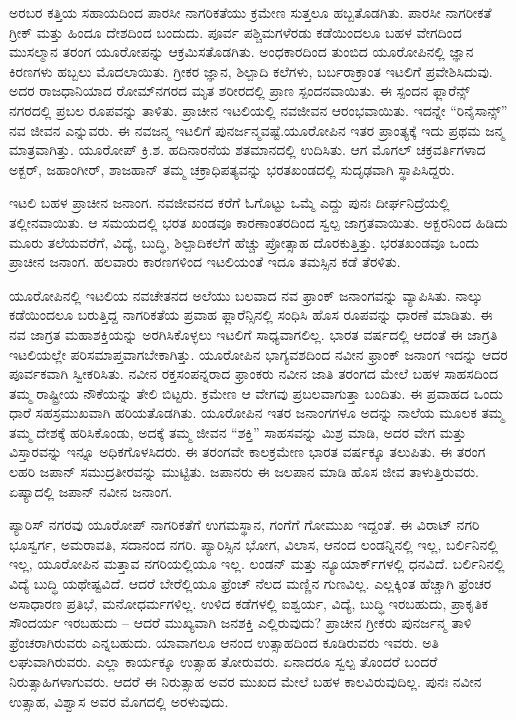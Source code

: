 \vskip 5pt

ಅರಬರ ಕತ್ತಿಯ ಸಹಾಯದಿಂದ ಪಾರಸೀ ನಾಗರಿಕತೆಯು ಕ್ರಮೇಣ ಸುತ್ತಲೂ ಹಬ್ಬತೊಡಗಿತು. ಪಾರಸೀ ನಾಗರೀಕತೆ ಗ್ರೀಕ್​ ಮತ್ತು ಹಿಂದೂ ದೇಶದಿಂದ ಬಂದುದು. ಪೂರ್ವ ಪಶ್ಚಿಮಗಳೆರಡು ಕಡೆಯಿಂದಲೂ ಬಹಳ ವೇಗದಿಂದ ಮುಸಲ್ಮಾನ ತರಂಗ ಯೂರೋಪನ್ನು ಆಕ್ರಮಿಸತೊಡಗಿತು. ಅಂಧಕಾರದಿಂದ ತುಂಬಿದ ಯೂರೋಪಿನಲ್ಲಿ ಜ್ಞಾನ ಕಿರಣಗಳು ಹಬ್ಬಲು ಮೊದಲಾಯಿತು. ಗ್ರೀಕರ ಜ್ಞಾನ, ಶಿಲ್ಪಾದಿ ಕಲೆಗಳು, ಬರ್ಬರಾ\break ಕ್ರಾಂತ ಇಟಲಿಗೆ ಪ್ರವೇಶಿಸಿದುವು. ಅದರ ರಾಜಧಾನಿಯಾದ ರೋಮ್​ನಗರದ ಮೃತ ಶರೀರದಲ್ಲಿ ಪ್ರಾಣ ಸ್ಪಂದನವಾಯಿತು. ಈ ಸ್ಪಂದನ ಫ್ಲಾರೆನ್ಸ್​ ನಗರದಲ್ಲಿ ಪ್ರಬಲ ರೂಪವನ್ನು ತಾಳಿತು. ಪ್ರಾಚೀನ ಇಟಲಿಯಲ್ಲಿ ನವಜೀವನ ಆರಂಭವಾಯಿತು. ಇದನ್ನೇ “ರಿನೈಸಾನ್ಸ್​” ನವ ಜೀವನ ಎನ್ನುವರು. ಈ ನವಜನ್ಮ ಇಟಲಿಗೆ ಪುನರ್ಜನ್ಮವಷ್ಟೆ.\break ಯೂರೋಪಿನ ಇತರ ಪ್ರಾಂತ್ಯಕ್ಕೆ ಇದು ಪ್ರಥಮ ಜನ್ಮ ಮಾತ್ರವಾಗಿತ್ತು. ಯೂರೋಪ್​ ಕ್ರಿ.ಶ. ಹದಿನಾರನೆಯ ಶತಮಾನದಲ್ಲಿ ಉದಿಸಿತು. ಆಗ ಮೊಗಲ್​ ಚಕ್ರವರ್ತಿಗಳಾದ ಅಕ್ಬರ್​, ಜಹಾಂಗೀರ್​, ಶಾಜಹಾನ್​ ತಮ್ಮ ಚಕ್ರಾಧಿಪತ್ಯವನ್ನು ಭರತಖಂಡದಲ್ಲಿ ಸುದೃಢವಾಗಿ ಸ್ಥಾಪಿಸಿದ್ದರು.

\vskip 5pt

ಇಟಲಿ ಬಹಳ ಪ್ರಾಚೀನ ಜನಾಂಗ. ನವಜೀವನದ ಕರೆಗೆ ಓಗೊಟ್ಟು ಒಮ್ಮೆ ಎದ್ದು ಪುನಃ ದೀರ್ಘನಿದ್ರೆಯಲ್ಲಿ ತಲ್ಲೀನವಾಯಿತು. ಆ ಸಮಯದಲ್ಲಿ ಭರತ ಖಂಡವೂ ಕಾರಣಾಂತರ\break ದಿಂದ ಸ್ವಲ್ಪ ಜಾಗ್ರತವಾಯಿತು. ಅಕ್ಬರನಿಂದ ಹಿಡಿದು ಮೂರು ತಲೆಯವರೆಗೆ, ವಿದ್ಯೆ, ಬುದ್ಧಿ, ಶಿಲ್ಪಾದಿಕಲೆಗೆ ಹೆಚ್ಚು ಪ್ರೋತ್ಸಾಹ ದೊರಕುತ್ತಿತ್ತು. ಭರತಖಂಡವೂ ಒಂದು ಪ್ರಾಚೀನ ಜನಾಂಗ. ಹಲವಾರು ಕಾರಣಗಳಿಂದ ಇಟಲಿಯಂತೆ ಇದೂ ತಮಸ್ಸಿನ ಕಡೆ ತೆರಳಿತು.

\vskip 5pt

ಯೂರೋಪಿನಲ್ಲಿ ಇಟಲಿಯ ನವಚೇತನದ ಅಲೆಯು ಬಲವಾದ ನವ ಫ್ರಾಂಕ್​ ಜನಾಂಗವನ್ನು ವ್ಯಾಪಿಸಿತು. ನಾಲ್ಕು ಕಡೆಯಿಂದಲೂ ಬರುತ್ತಿದ್ದ ನಾಗರಿಕತೆಯ ಪ್ರವಾಹ ಫ್ಲಾರೆನ್ಸಿನಲ್ಲಿ ಸಂಧಿಸಿ ಹೊಸ ರೂಪವನ್ನು ಧಾರಣೆ ಮಾಡಿತು. ಈ ನವ ಜಾಗ್ರತ ಮಹಾಶಕ್ತಿಯನ್ನು ಅರಗಿಸಿಕೊಳ್ಳಲು ಇಟಲಿಗೆ ಸಾಧ್ಯವಾಗಲಿಲ್ಲ. ಭಾರತ ವರ್ಷದಲ್ಲಿ ಆದಂತೆ ಈ ಜಾಗ್ರತಿ ಇಟಲಿಯಲ್ಲೇ ಪರಿಸಮಾಪ್ತವಾಗಬೇಕಾಗಿತ್ತು. ಯೂರೋಪಿನ ಭಾಗ್ಯವಶದಿಂದ ನವೀನ ಫ್ರಾಂಕ್​ ಜನಾಂಗ ಇದನ್ನು ಆದರ ಪೂರ್ವಕವಾಗಿ ಸ್ವೀಕರಿಸಿತು. ನವೀನ ರಕ್ತಸಂಪನ್ನ\break ರಾದ ಫ್ರಾಂಕರು ನವೀನ ಜಾತಿ ತರಂಗದ ಮೇಲೆ ಬಹಳ ಸಾಹಸದಿಂದ ತಮ್ಮ ರಾಷ್ಟ್ರೀಯ ನೌಕೆಯನ್ನು ತೇಲಿ ಬಿಟ್ಟರು. ಕ್ರಮೇಣ ಆ ವೇಗವು ಪ್ರಬಲವಾಗುತ್ತಾ ಬಂದಿತು. ಈ ಪ್ರವಾಹದ ಒಂದು ಧಾರೆ ಸಹಸ್ರಮುಖವಾಗಿ ಹರಿಯತೊಡಗಿತು. ಯೂರೋಪಿನ ಇತರ ಜನಾಂಗಗಳೂ ಅದನ್ನು ನಾಲೆಯ ಮೂಲಕ ತಮ್ಮ ತಮ್ಮ ದೇಶಕ್ಕೆ ಹರಿಸಿಕೊಂಡು, ಅದಕ್ಕೆ ತಮ್ಮ ಜೀವನ “ಶಕ್ತಿ” ಸಾಹಸವನ್ನು ಮಿಶ್ರ ಮಾಡಿ, ಅದರ ವೇಗ ಮತ್ತು ವಿಸ್ತಾರವನ್ನು ಇನ್ನೂ ಅಧಿಕಗೊಳಸಿದರು. ಈ ತರಂಗವೇ ಕಾಲಕ್ರಮೇಣ ಭಾರತ ವರ್ಷಕ್ಕೂ ತಲುಪಿತು. ಈ ತರಂಗ ಲಹರಿ ಜಪಾನ್​ ಸಮುದ್ರತೀರವನ್ನು ಮುಟ್ಟಿತು. ಜಪಾನರು ಈ ಜಲಪಾನ ಮಾಡಿ ಹೊಸ ಜೀವ ತಾಳುತ್ತಿರುವರು. ಏಷ್ಯಾದಲ್ಲಿ ಜಪಾನ್​ ನವೀನ ಜನಾಂಗ.

\vskip 5pt

ಪ್ಯಾರಿಸ್​ ನಗರವು ಯೂರೋಪ್​ ನಾಗರಿಕತೆಗೆ ಉಗಮಸ್ಥಾನ, ಗಂಗೆಗೆ ಗೋಮುಖ ಇದ್ದಂತೆ. ಈ ವಿರಾಟ್​ ನಗರಿ ಭೂಸ್ವರ್ಗ, ಅಮರಾವತಿ, ಸದಾನಂದ ನಗರಿ. ಪ್ಯಾರಿಸ್ಸಿನ ಭೋಗ, ವಿಲಾಸ, ಆನಂದ ಲಂಡನ್ನಿನಲ್ಲಿ ಇಲ್ಲ, ಬರ್ಲಿನಿನಲ್ಲಿ ಇಲ್ಲ, ಯೂರೋಪಿನ ಮತ್ತಾವ ನಗರಿಯಲ್ಲಿಯೂ ಇಲ್ಲ. ಲಂಡನ್​ ಮತ್ತು ನ್ಯೂಯಾರ್ಕ್​ಗಳಲ್ಲಿ ಧನವಿದೆ. ಬರ್ಲಿನಿನಲ್ಲಿ ವಿದ್ಯೆ ಬುದ್ಧಿ ಯಥೇಷ್ಟವಿದೆ. ಆದರೆ ಬೇರೆಲ್ಲಿಯೂ ಫ್ರೆಂಚ್​ ನೆಲದ ಮಣ್ಣಿನ ಗುಣವಿಲ್ಲ. ಎಲ್ಲಕ್ಕಿಂತ ಹೆಚ್ಚಾಗಿ ಫ್ರೆಂಚರ ಅಸಾಧಾರಣ ಪ್ರತಿಭೆ, ಮನೋಧರ್ಮಗಳಿಲ್ಲ. ಉಳಿದ ಕಡೆಗಳಲ್ಲಿ ಐಶ್ವರ್ಯ, ವಿದ್ಯೆ, ಬುದ್ಧಿ ಇರಬಹುದು, ಪ್ರಾಕೃತಿಕ ಸೌಂದರ್ಯ ಇರಬಹುದು – ಆದರೆ ಮುಖ್ಯವಾಗಿ ಜನಶಕ್ತಿ ಎಲ್ಲಿರುವುದು? ಪ್ರಾಚೀನ ಗ್ರೀಕರು ಪುನರ್ಜನ್ಮ ತಾಳಿ ಫ್ರೆಂಚರಾಗಿರುವರು ಎನ್ನಬಹುದು. ಯಾವಾಗಲೂ ಆನಂದ ಉತ್ಸಾಹದಿಂದ ಕೂಡಿರುವರು ಇವರು. ಅತಿ ಲಘುವಾಗಿರುವರು. ಎಲ್ಲಾ ಕಾರ್ಯಕ್ಕೂ ಉತ್ಸಾಹ ತೋರುವರು. ಏನಾದರೂ ಸ್ವಲ್ಪ ತೊಂದರೆ ಬಂದರೆ ನಿರುತ್ಸಾಹಿಗಳಾಗುವರು. ಆದರೆ ಈ ನಿರುತ್ಸಾಹ ಅವರ ಮುಖದ ಮೇಲೆ ಬಹಳ ಕಾಲವಿರುವುದಿಲ್ಲ. ಪುನಃ ನವೀನ ಉತ್ಸಾಹ, ವಿಶ್ವಾಸ ಅವರ ಮೊಗದಲ್ಲಿ ಅರಳುವುದು.

